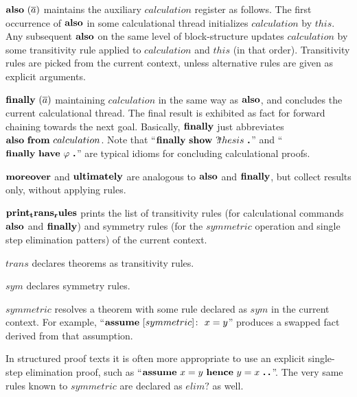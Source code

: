 \begin{descr}

\item [${\mathord{\mathbf{also}}}~(\overline{a})$] maintains the auxiliary $calculation$ register as
  follows.  The first occurrence of ${\mathord{\mathbf{also}}}$ in some calculational thread
  initializes $calculation$ by $this$. Any subsequent ${\mathord{\mathbf{also}}}$ on the same
  level of block-structure updates $calculation$ by some transitivity rule
  applied to $calculation$ and $this$ (in that order).  Transitivity rules are
  picked from the current context, unless alternative rules are given as
  explicit arguments.

\item [${\mathord{\mathbf{finally}}}~(\overline{a})$] maintaining $calculation$ in the same way as
  ${\mathord{\mathbf{also}}}$, and concludes the current calculational thread.  The final result
  is exhibited as fact for forward chaining towards the next goal. Basically,
  ${\mathord{\mathbf{finally}}}$ just abbreviates ${\mathord{\mathbf{also}}}~{\mathord{\mathbf{from}}}~calculation$.  Note that
  ``$\FINALLY~\SHOW{}{\Var{thesis}}~\DOT$'' and
  ``$\FINALLY~\HAVE{}{\phi}~\DOT$'' are typical idioms for concluding
  calculational proofs.

\item [${\mathord{\mathbf{moreover}}}$ and ${\mathord{\mathbf{ultimately}}}$] are analogous to ${\mathord{\mathbf{also}}}$ and ${\mathord{\mathbf{finally}}}$,
  but collect results only, without applying rules.

\item [${\mathord{\mathbf{print_trans_rules}}}$] prints the list of transitivity
  rules (for calculational commands ${\mathord{\mathbf{also}}}$ and ${\mathord{\mathbf{finally}}}$) and symmetry rules
  (for the $symmetric$ operation and single step elimination patters) of the
  current context.

\item [$trans$] declares theorems as transitivity rules.

\item [$sym$] declares symmetry rules.

\item [$symmetric$] resolves a theorem with some rule declared as $sym$ in the
  current context.  For example, ``$\ASSUME{[symmetric]}{x = y}$'' produces a
  swapped fact derived from that assumption.

  In structured proof texts it is often more appropriate to use an explicit
  single-step elimination proof, such as ``$\ASSUME{}{x = y}~\HENCE{}{y =
    x}~\DDOT$''.  The very same rules known to $symmetric$ are declared as
  $elim?$ as well.

\end{descr}


